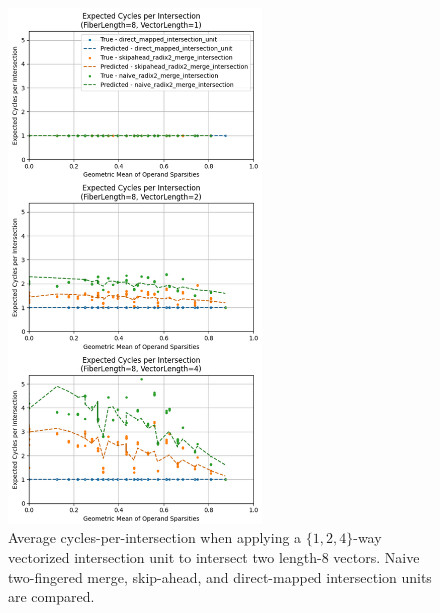 \begin{figure}[H]
\centering
\includegraphics[width=0.6\textwidth]{figures/expected_cycles_F8.png}
\caption{Average cycles-per-intersection when applying a $\{1,2,4\}$-way vectorized intersection unit to intersect two length-8 vectors. Naive two-fingered merge, skip-ahead, and direct-mapped intersection units are compared.}
\label{fig:expected_cycles_F8}
\end{figure}

\newpage

